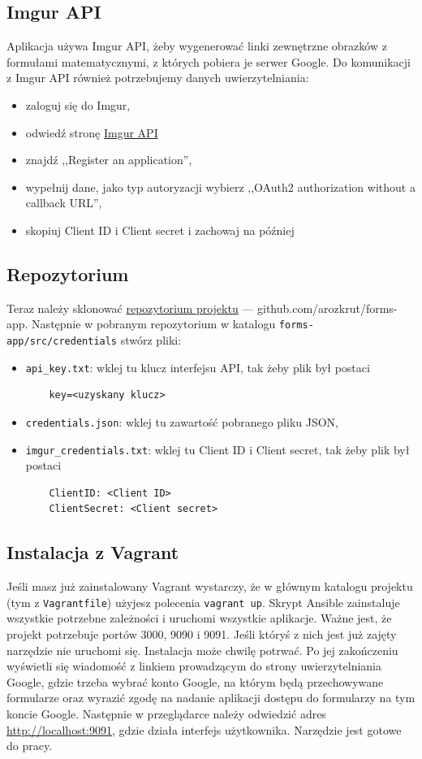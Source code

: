 \subsection{Imgur API}
Aplikacja używa Imgur API, żeby wygenerować linki zewnętrzne obrazków
z formułami matematycznymi, z których pobiera je serwer Google. Do komunikacji
z Imgur API również potrzebujemy danych uwierzytelniania:
\begin{itemize}
  \item zaloguj się do Imgur,
  \item odwiedź stronę \href{https://api.imgur.com/}{Imgur API}
  \item znajdź ,,Register an application'',
  \item wypełnij dane, jako typ autoryzacji wybierz ,,OAuth2 authorization without
  a callback URL'',
  \item skopiuj Client ID i Client secret i zachowaj na później
\end{itemize}

\subsection{Repozytorium}
Teraz należy sklonować \href{https://github.com/arozkrut/forms-apps}
{repozytorium projektu} --- github.com/arozkrut/forms-app.
Następnie w pobranym repozytorium w katalogu \texttt{forms-app/src/credentials}
stwórz pliki:
\begin{itemize}
  \item \texttt{api\_key.txt}: wklej tu klucz interfejsu API, tak żeby plik był
  postaci
  \begin{verbatim}
    key=<uzyskany klucz>
  \end{verbatim}
  \item \texttt{credentials.json}: wklej tu zawartość pobranego pliku JSON,
  \item \texttt{imgur\_credentials.txt}: wklej tu Client ID i Client secret,
  tak żeby plik był postaci
  \begin{verbatim}
    ClientID: <Client ID>
    ClientSecret: <Client secret>
  \end{verbatim}
\end{itemize}

\subsection{Instalacja z Vagrant}
Jeśli masz już zainstalowany Vagrant wystarczy, że w głównym katalogu projektu
(tym z \texttt{Vagrantfile}) użyjesz polecenia \texttt{vagrant up}. Skrypt
Ansible zainstaluje wszystkie potrzebne zależności i uruchomi wszystkie
aplikacje. Ważne jest, że projekt potrzebuje portów 3000, 9090 i 9091.
Jeśli któryś z nich jest już zajęty narzędzie nie uruchomi się. Instalacja może
chwilę potrwać. Po jej zakończeniu wyświetli się wiadomość z linkiem prowadzącym
do strony uwierzytelniania Google, gdzie trzeba wybrać konto Google, na którym
będą przechowywane formularze oraz wyrazić zgodę na nadanie aplikacji dostępu do
formularzy na tym koncie Google. Następnie w przeglądarce należy odwiedzić adres
\href{http://localhost:9091}{http://localhost:9091}, gdzie działa interfejs
użytkownika. Narzędzie jest gotowe do pracy.

